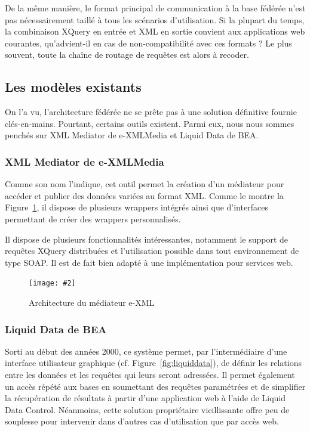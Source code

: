 \documentclass[a4paper,10pt]{article}
\newcommand{\fref}[1]{Figure~\ref{#1}}
\newcommand{\insertfigure}[4]{
\begin{figure}[ht!]
\begin{center}
\texttt{[image: \#2]}
\caption{#3}
\label{#4}
\end{center}
\end{figure}
}
\begin{document}
De la même manière, le format principal de communication à la base fédérée n'est pas nécessairement taillé à tous les scénarios d'utilisation. Si la plupart du temps, la combinaison XQuery en entrée et XML en sortie convient aux applications web courantes, qu'advient-il en cas de non-compatibilité avec  ces formats ? Le plus souvent, toute la chaîne de routage de requêtes est alors à recoder.


\subsection{Les modèles existants}
On l'a vu, l'architecture fédérée ne se prête pas à une solution définitive fournie clés-en-mains. Pourtant, certains outils existent. Parmi eux, nous nous sommes penchés sur XML Mediator de e-XMLMedia et Liquid Data de BEA.

\subsubsection{XML Mediator de e-XMLMedia}
Comme son nom l'indique, cet outil permet la création d'un médiateur pour accéder et publier des données variées au format XML. Comme le montre la \fref{fig:xmlmediator}, il dispose de plusieurs wrappers intégrés ainsi que d'interfaces permettant de créer des wrappers personnalisés.

Il dispose de plusieurs fonctionnalités intéressantes, notamment le support de requêtes XQuery distribuées et l'utilisation possible dans tout environnement de type SOAP. Il est de fait bien adapté à une implémentation pour services web.

\insertfigure{1}{E-XML.png}{Architecture du médiateur e-XML}{fig:xmlmediator}

\subsubsection{Liquid Data de BEA}
Sorti au début des années 2000, ce système permet, par l'intermédiaire d'une interface utilisateur graphique (cf. \fref{fig:liquiddata}), de définir les relations entre les données et les requêtes qui leurs seront adressées. Il permet également un accès répété aux bases en soumettant des requêtes paramétrées et de simplifier la récupération de résultats à partir d'une application web à l'aide de Liquid Data Control. Néanmoins, cette solution propriétaire vieillissante offre peu de souplesse pour intervenir dans d'autres cas d'utilisation que par accès web.
\end{document}
